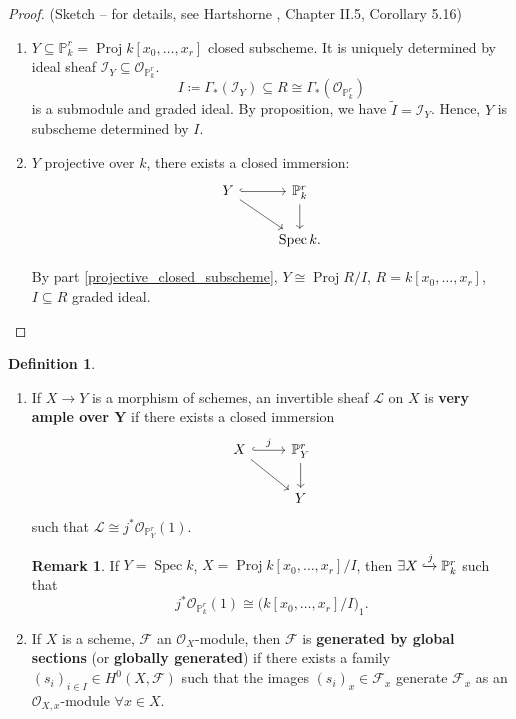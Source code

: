 \documentclass[12pt]{article}
\DeclareMathOperator{\Spec}{Spec}
\DeclareMathOperator{\Proj}{Proj}
\theoremstyle{definition}
\newtheorem*{definition}{Definition}
\newtheorem*{remark}{Remark}
\begin{document}
\begin{proof}
(Sketch -- for details, see Hartshorne \cite{hartshorne2013algebraic}, Chapter II.5, Corollary 5.16)

\begin{enumerate}[label=\arabic*)]
\item $Y\subseteq\mathbb{P}_k^r=\Proj k[x_0,\ldots,x_r]$ closed subscheme. It is uniquely determined by ideal sheaf $\mathcal{I}_Y\subseteq\mathcal{O}_{\mathbb{P}_k^r}$.
\[I\coloneqq\Gamma_*(\mathcal{I}_Y)\subseteq R\cong\Gamma_*(\mathcal{O}_{\mathbb{P}_k^r})\]
is a submodule and graded ideal. By proposition, we have $\widetilde{I}=\mathcal{I}_Y$. Hence, $Y$ is subscheme determined by $I$.

\item $Y$ projective over $k$, there exists a closed immersion:
\[
\begin{tikzcd}
Y\arrow[r,hook]\arrow[rd]&\mathbb{P}_k^r\arrow[d]\\
&\Spec k.
\end{tikzcd}
\]

By part \ref{projective_closed_subscheme}, $Y\cong\Proj R/I$, $R=k[x_0,\ldots,x_r]$, $I\subseteq R$ graded ideal.
\end{enumerate}
\end{proof}

\begin{definition}
\begin{enumerate}[label=\arabic*)]
\item If $X\rightarrow Y$ is a morphism of schemes, an invertible sheaf $\mathcal{L}$ on $X$ is \textbf{very ample over $\boldsymbol{Y}$} if there exists a closed immersion
\[
\begin{tikzcd}
X\arrow[r,hook,"j"]\arrow[rd]&\mathbb{P}_Y^r\arrow[d]\\
&Y
\end{tikzcd}
\]
such that $\mathcal{L}\cong j^*\mathcal{O}_{\mathbb{P}_Y^r}(1)$.

\begin{remark}
If $Y=\Spec k$, $X=\Proj k[x_0,\ldots,x_r]/I$, then $\exists X\xhookrightarrow{j}\mathbb{P}_k^r$ such that
\[j^*\mathcal{O}_{\mathbb{P}_k^r}(1)\cong\big(k[x_0,\ldots,x_r]/I\big)_1.\]
\end{remark}

\item If $X$ is a scheme, $\mathcal{F}$ an $\mathcal{O}_X$-module, then $\mathcal{F}$ is \textbf{generated by global sections} (or \textbf{globally generated}) if there exists a family $(s_i)_{i\in I}\in H^0(X,\mathcal{F})$ such that the images $(s_i)_x\in\mathcal{F}_x$ generate $\mathcal{F}_x$ as an $\mathcal{O}_{X,x}$-module $\forall x\in X$.
\end{enumerate}
\end{definition}
\end{document}
